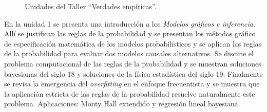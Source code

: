 \documentclass[a4paper,11pt]{book}
\theoremstyle{definition}
\begin{document}
\begin{figure}[ht!]
\centering
  \begin{subfigure}[b]{0.32\textwidth} \centering
  \end{subfigure}
  \hfill
  \begin{subfigure}[b]{0.32\textwidth} \centering
  \end{subfigure}
  \hfill
  \begin{subfigure}[b]{0.32\textwidth} \centering
  \end{subfigure}
  \hfill
  \begin{subfigure}[b]{0.32\textwidth} \centering
  \end{subfigure}
  \hfill
  \begin{subfigure}[b]{0.32\textwidth} \centering
  \end{subfigure}
  \hfill
  \begin{subfigure}[b]{0.32\textwidth} \centering
  \end{subfigure}
  \caption{Unidades del Taller ``Verdades emp\'iricas''.}
\end{figure}


En la unidad 1 se presenta una introducci\'on a los \emph{Modelos gr\'aficos e inferencia}.
%
All\'i se justifican las reglas de la probabilidad y se presentan los m\'etodos gr\'afico de especificaci\'on matem\'atica de los modelos probabil\'isticos y se aplican las reglas de la probabilidad para evaluar dos modelos causales alternativos.
%
Se discute el problema computacional de las reglas de la probabilidad y se muestran soluciones bayesianas del siglo 18 y soluciones de la f\'isica estad\'istica del siglo 19.
%
Finalmente se revisa la emergencia del \emph{overfitting} en el enfoque frecuentista y se muestra que la aplicaci\'on estricta de las reglas de la probabilidad resuelve naturalmente este problema.
%
Aplicaciones: Monty Hall extendido y regresi\'on lineal bayesiana.

\end{document}
